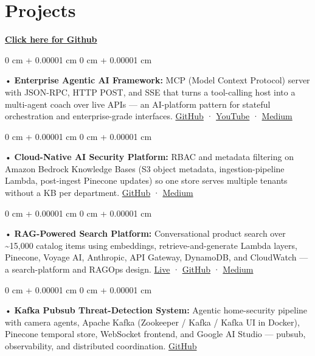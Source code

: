 \documentclass[10pt, letterpaper]{article}
\newenvironment{onecolentry}{
    \begin{adjustwidth}{
        0 cm + 0.00001 cm
    }{
        0 cm + 0.00001 cm
    }
}{
    \end{adjustwidth}
} %
\begin{document}
\section{Projects}
    \vspace{2 pt}
\textbf{\href{https://github.com/daedalus-s}{Click here for Github}}
\begin{onecolentry}
     • \textbf{Enterprise Agentic AI Framework:} MCP (Model Context Protocol) server with JSON-RPC, HTTP POST, and SSE that turns a tool-calling host into a multi-agent coach over live APIs --- an AI-platform pattern for stateful orchestration and enterprise-grade interfaces. \href{https://github.com/daedalus-s/dota2-mcp-server}{GitHub} · \href{https://www.youtube.com/watch?v=op2gTYyFb5U}{YouTube} · \href{https://medium.com/@sreenikethaathreya/get-good-at-using-ai-noob-5d2576203112}{Medium}
\end{onecolentry}
\begin{onecolentry}
     • \textbf{Cloud-Native AI Security Platform:} RBAC and metadata filtering on Amazon Bedrock Knowledge Bases (S3 object metadata, ingestion-pipeline Lambda, post-ingest Pinecone updates) so one store serves multiple tenants without a KB per department. \href{https://github.com/daedalus-s/bedrock-acl-metadata}{GitHub} · \href{https://medium.com/@sreenikethaathreya/building-a-permission-aware-genai-application-on-amazon-bedrock-8fdc2410dd43}{Medium}
\end{onecolentry}
\begin{onecolentry}
     • \textbf{RAG-Powered Search Platform:} Conversational product search over \textasciitilde 15,000 catalog items using embeddings, retrieve-and-generate Lambda layers, Pinecone, Voyage AI, Anthropic, API Gateway, DynamoDB, and CloudWatch --- a search-platform and RAGOps design. \href{https://prorecsa.co}{Live} · \href{https://github.com/daedalus-s/ragops-doc}{GitHub} · \href{https://medium.com/@sreenikethaathreya/from-rags-to-riches-bba8a671d5e6}{Medium}
\end{onecolentry}
\begin{onecolentry}
     • \textbf{Kafka Pubsub Threat-Detection System:} Agentic home-security pipeline with camera agents, Apache Kafka (Zookeeper / Kafka / Kafka UI in Docker), Pinecone temporal store, WebSocket frontend, and Google AI Studio --- pubsub, observability, and distributed coordination. \href{https://github.com/daedalus-s/threat-detection-gdg}{GitHub}
\end{onecolentry}
\vspace{2 pt}
        \vspace{2 pt }
\end{document}
